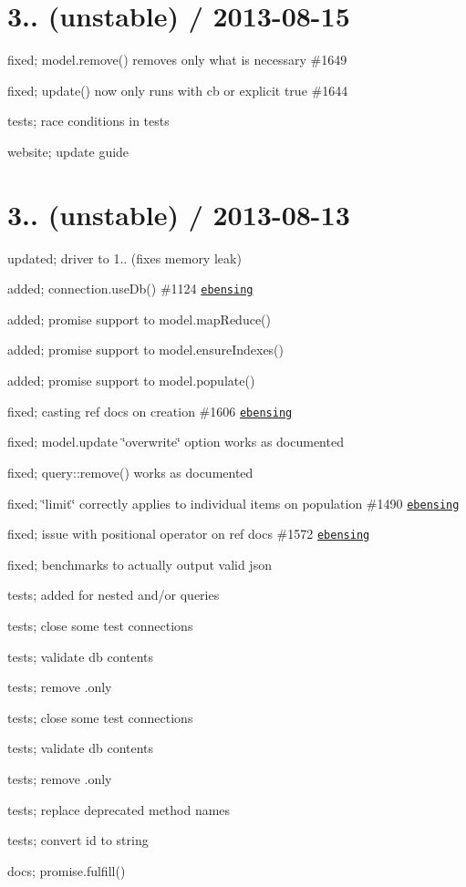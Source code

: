 \section*{3.. (unstable) / 2013-\/08-\/15 }


\begin{DoxyItemize}
\item fixed; model.\+remove() removes only what is necessary \#1649
\item fixed; update() now only runs with cb or explicit true \#1644
\item tests; race conditions in tests
\item website; update guide
\end{DoxyItemize}

\section*{3.. (unstable) / 2013-\/08-\/13 }


\begin{DoxyItemize}
\item updated; driver to 1.. (fixes memory leak)
\item added; connection.\+use\+Db() \#1124 \href{https://github.com/ebensing}{\tt ebensing}
\item added; promise support to model.\+map\+Reduce()
\item added; promise support to model.\+ensure\+Indexes()
\item added; promise support to model.\+populate()
\item fixed; casting ref docs on creation \#1606 \href{https://github.com/ebensing}{\tt ebensing}
\item fixed; model.\+update \char`\"{}overwrite\char`\"{} option works as documented
\item fixed; query\+::remove() works as documented
\item fixed; \char`\"{}limit\char`\"{} correctly applies to individual items on population \#1490 \href{https://github.com/ebensing}{\tt ebensing}
\item fixed; issue with positional operator on ref docs \#1572 \href{https://github.com/ebensing}{\tt ebensing}
\item fixed; benchmarks to actually output valid json
\item tests; added for nested and/or queries
\item tests; close some test connections
\item tests; validate db contents
\item tests; remove .only
\item tests; close some test connections
\item tests; validate db contents
\item tests; remove .only
\item tests; replace deprecated method names
\item tests; convert id to string
\item docs; promise.\+fulfill()
\end{DoxyItemize}

